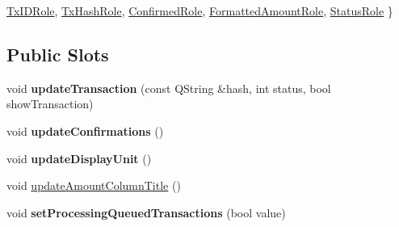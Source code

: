 \begin{DoxyCompactItemize}
\newline
\mbox{\hyperlink{class_transaction_table_model_a4b248508c36df598476affbf9871d1e6aaf979aec852c99afac10243f78a8a1e0}{Tx\+I\+D\+Role}}, 
\mbox{\hyperlink{class_transaction_table_model_a4b248508c36df598476affbf9871d1e6a4e585e010f9933a35ab12affb42d251d}{Tx\+Hash\+Role}}, 
\mbox{\hyperlink{class_transaction_table_model_a4b248508c36df598476affbf9871d1e6ae4fb059af39604caf75e71f9176edb16}{Confirmed\+Role}}, 
\mbox{\hyperlink{class_transaction_table_model_a4b248508c36df598476affbf9871d1e6affd966c654a96ad65574e30986f80563}{Formatted\+Amount\+Role}}, 
\newline
\mbox{\hyperlink{class_transaction_table_model_a4b248508c36df598476affbf9871d1e6a3f8e62622565f361805b2d050da5b2b6}{Status\+Role}}
 \}
\end{DoxyCompactItemize}
\subsection*{Public Slots}
\begin{DoxyCompactItemize}
\item 
\mbox{\label{class_transaction_table_model_a8de43b3c7ba0612304906eb5a2f51a06}} 
void {\bfseries update\+Transaction} (const Q\+String \&hash, int status, bool show\+Transaction)
\item 
\mbox{\label{class_transaction_table_model_a5899d9eda6465bfb16d2846b6459567e}} 
void {\bfseries update\+Confirmations} ()
\item 
\mbox{\label{class_transaction_table_model_a8b73ff7d72ec2dd69790bc61bbe8575e}} 
void {\bfseries update\+Display\+Unit} ()
\item 
void \mbox{\hyperlink{class_transaction_table_model_acbb6e7531f507369ad18b656ad7b3f10}{update\+Amount\+Column\+Title}} ()
\item 
\mbox{\label{class_transaction_table_model_a9f8f2cdb61517ab04f880d416aa927c7}} 
void {\bfseries set\+Processing\+Queued\+Transactions} (bool value)
\end{DoxyCompactItemize}
